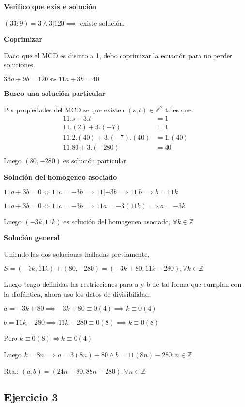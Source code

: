 \textbf{Verifico que existe solución}

$ (33:9) = 3 \wedge 3|120 \implies $ existe solución.

\textbf{Coprimizar}

Dado que el MCD es disinto a 1, debo coprimizar la ecuación para no perder soluciones.

$ 33a+9b = 120 \leftrightsquigarrow 11a+3b=40$

\textbf{Busco una solución particular}

Por propiedades del MCD se que existen $ (s,t) \in \mathbb{Z}^2 $ tales que:
\begin{align*}
    11.s + 3.t &= 1 \\
    11.(2) + 3.(-7) &= 1 \\
    11.2.(40) + 3.(-7).(40) &= 1.(40) \\
    11.80 + 3.(-280) &= 40 \\
\end{align*}
Luego $ (80,-280) $ es solución particular.

\textbf{Solución del homogeneo asociado}

$ 11a +3b = 0 \iff 11a = -3b \implies 11|-3b \implies 11|b \implies b=11k $

$ 11a +3b = 0 \iff 11a = -3b \implies 11a = -3(11k) \implies a = -3k $

Luego $ (-3k,11k) $ es solución del homogeneo asociado, $ \forall k \in \mathbb{Z} $

\textbf{Solución general}

Uniendo las dos soluciones halladas previamente,

$ S = (-3k,11k) + (80,-280) = (-3k+80, 11k-280); \forall k \in \mathbb{Z} $

Luego tengo definidas las restricciones para a y b de tal forma que cumplan con la diofántica, ahora uso los datos de divisibilidad.

$ a = -3k+80 \implies -3k+80 \equiv 0(4) \implies k \equiv 0(4)$

$ b = 11k-280 \implies 11k-280 \equiv 0(8) \implies k \equiv 0(8)$

Pero $ k \equiv 0(8) \iff k \equiv 0(4) $

Luego $ k = 8n \implies a = 3(8n) + 80 \wedge b=11(8n)-280; n \in \mathbb{Z}$

Rta.: $ (a,b) = (24n+80, 88n-280); \forall n \in \mathbb{Z} $

\subsection{Ejercicio 3}

